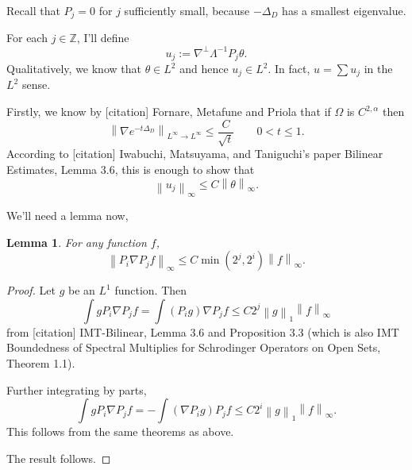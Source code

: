 \documentclass[11pt]{amsart}
\newtheorem{lemma}[theorem]{Lemma}
\theoremstyle{remark}
\theoremstyle{definition}
\newcommand{\Z}{\mathbb{Z}}
\newcommand{\norm}[1]{\left\lVert#1\right\rVert}
\newcommand{\grad}{\nabla}
\newcommand{\Laplace}{\Delta}
\begin{document}
Recall that $P_j = 0$ for $j$ sufficiently small, because $-\Laplace_D$ has a smallest eigenvalue.  

For each $j \in \Z$, I'll define
\[ u_j := \grad^\perp \Lambda^{-1} P_j \theta. \]
Qualitatively, we know that $\theta \in L^2$ and hence $u_j \in L^2$.  In fact, $u = \sum u_j$ in the $L^2$ sense.  

Firstly, we know by [citation] Fornare, Metafune and Priola that if $\Omega$ is $C^{2,\alpha}$ then
\[ \norm{\grad e^{-t\Laplace_D}}_{L^\infty \to L^\infty} \leq \frac{C}{\sqrt{t}} \qquad 0 < t \leq 1. \]
According to [citation] Iwabuchi, Matsuyama, and Taniguchi's paper Bilinear Estimates, Lemma 3.6, this is enough to show that
\[ \norm{u_j}_\infty \leq C \norm{\theta}_\infty. \]

We'll need a lemma now,
\begin{lemma} \label{thm:grad and proj}
For any function $f$,
\[ \norm{P_i \grad P_j f}_\infty \leq C \min(2^j,2^i) \norm{f}_\infty. \]
\end{lemma}
\begin{proof}
Let $g$ be an $L^1$ function.  Then
\[ \int g P_i \grad P_j f = \int (P_i g) \grad P_j f \leq C 2^j \norm{g}_1 \norm{f}_\infty \]
from [citation] IMT-Bilinear, Lemma 3.6 and Proposition 3.3 (which is also IMT Boundedness of Spectral Multiplies for Schrodinger Operators on Open Sets, Theorem 1.1).  

Further integrating by parts,
\[ \int g P_i \grad P_j f = - \int (\grad P_i g) P_j f \leq C 2^i \norm{g}_1 \norm{f}_\infty. \]
This follows from the same theorems as above.  

The result follows.  
\end{proof}
\end{document}
